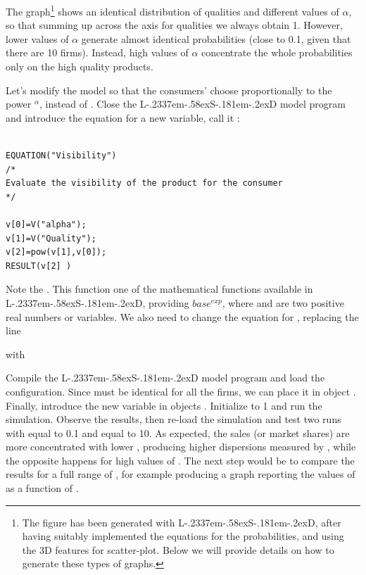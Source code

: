 \documentclass [11pt,a4paper] {book}
\def\LsD{{L\kern-.2337em\lower-.58ex\hbox{S}\kern-.181em\lower-.2ex\hbox{D}}\xspace}
\begin{document}
The graph\footnote{The figure has been generated with \LsD, after having suitably implemented the equations for the probabilities, and using the 3D features for scatter-plot. Below we will provide details on how to generate these types of graphs.} shows an identical distribution of qualities and different values of $\alpha$, so that summing up across the axis for qualities we always obtain 1. However, lower values of $\alpha$ generate almost identical probabilities (close to 0.1, given that there are 10 firms). Instead, high values of $\alpha$ concentrate the whole probabilities only on the high quality products.



Let's modify the model so that the consumers' choose proportionally to the power $^\alpha$, instead of . Close the \LsD model program and introduce the equation for a new variable, call it :

\begin{minipage}[h]{10cm}
\small
\begin{verbatim}

EQUATION("Visibility")
/*
Evaluate the visibility of the product for the consumer
*/

v[0]=V("alpha");
v[1]=V("Quality");
v[2]=pow(v[1],v[0]);
RESULT(v[2] )

\end{verbatim}
\normalsize
\end{minipage}

Note the . This function one of the mathematical functions available in \LsD, providing $base^{exp}$, where  and  are two positive real numbers or variables. We also need to change the equation for , replacing the line 


with 



Compile the \LsD model program and load the configuration. Since  must be identical for all the firms, we can place it in object . Finally, introduce the new variable  in objects . Initialize  to 1 and run the simulation. Observe the results, then re-load the simulation and test two runs with  equal to 0.1 and equal to 10. As expected, the sales (or market shares) are more concentrated with lower , producing higher dispersions measured by , while the opposite happens for high values of . The next step would be to compare the results for a full range of , for example producing a graph reporting the values of  as a function of .
\end{document}
